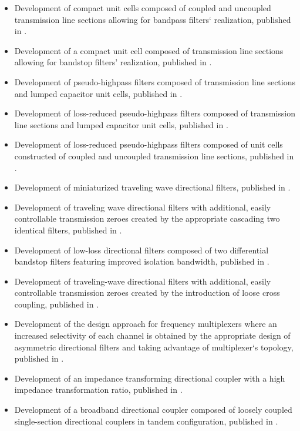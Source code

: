 \begin{itemize}[nosep]
\item Development of compact unit cells composed of coupled and uncoupled transmission line sections allowing for bandpass filters` realization, published in \cite{tmtt_right_left}.
\item Development of a compact unit cell composed of transmission line sections allowing for bandstop filters' realization, published in \cite{mwcl_dcrlh}.
\item Development of pseudo-highpass filters composed of transmission line sections and lumped capacitor unit cells, published in \cite{jemwa_pseudo-highpass}.
\item Development of loss-reduced pseudo-highpass filters composed of transmission line sections and lumped capacitor unit cells, published in \cite{mms_low-loss_wideband}.
\item Development of loss-reduced pseudo-highpass filters composed of unit cells constructed of coupled and uncoupled transmission line sections, published in \cite{mikon_low-loss_distributed}.
\item Development of miniaturized traveling wave directional filters, published in \cite{isap_miniaturized_DF}.
\item Development of traveling wave directional filters with additional, easily controllable transmission zeroes created by the appropriate cascading two identical filters, published in \cite{mikon_cascaded_DF}.
\item Development of low-loss directional filters composed of two differential bandstop filters featuring improved isolation bandwidth, published in \cite{mwcl_band_reject}.
\item Development of traveling-wave directional filters with additional, easily controllable transmission zeroes created by the introduction of loose cross coupling, published in \cite{tmtt_crosscoupled_DF}.
\item Development of the design approach for frequency multiplexers where an increased selectivity of each channel is obtained by the appropriate design of asymmetric directional filters and taking advantage of multiplexer`s topology, published in \cite{mwcl_cascaded_multipex}.
\item Development of an impedance transforming directional coupler with a high impedance transformation ratio, published in \cite{jmwt_imp_tranforming}.
\item Development of a broadband directional coupler composed of loosely coupled single-section directional couplers in tandem configuration, published in \cite{mwcl_tandem}.

\end{itemize}

